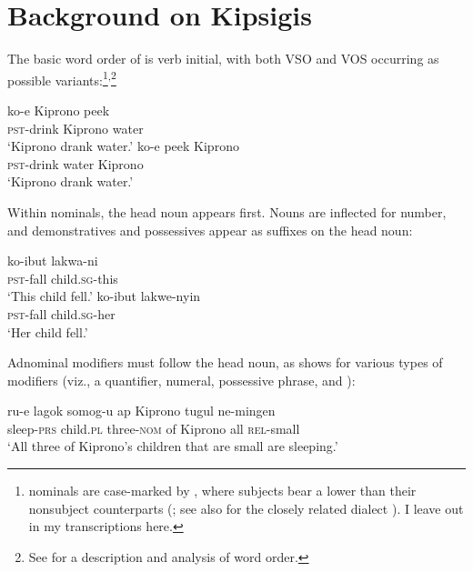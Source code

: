\documentclass[output=paper,newtxmath,modfonts,nonflat,hidelinks]{langsci/langscibook}
\begin{document}
\section{Background on Kipsigis}\label{sec:landman:background} 

The basic word order of  is verb initial, with both VSO and VOS occurring as possible variants:\footnote{ nominals are case-marked by , where subjects bear a lower  than their nonsubject counterparts (\citealt{Jake:1979}; see also \citealt{Creider:1989,Creider:2003} for the closely related dialect ). I leave out  in my transcriptions here.}\textsuperscript{,}\footnote{See \citealt{Diercks:2016b} for a description and analysis of  word order.} 

\ea
  \settowidth{}  
  \ea \gll	ko-e Kiprono peek\\
			\textsc{pst}-drink Kiprono water\\ 
      \glt ‘Kiprono drank water.’\label{ex:landman:VSO}
  \ex \gll ko-e peek Kiprono\\
           \textsc{pst}-drink water Kiprono\\ 
      \glt ‘Kiprono drank water.’\label{ex:landman:VOS}
  \z
\z
 
Within nominals, the head noun appears first. Nouns are inflected for number, and demonstratives  and possessives  appear as suffixes on the head noun:

\ea
  \settowidth{}  
  \ea \label{ex:landman:6a}
    \gll ko-ibut lakwa-ni \\
      \textsc{pst}-fall child.\textsc{sg}-this\\                 
      \glt ‘This child fell.’
  \ex\label{ex:landman:6b}
    \gll ko-ibut lakwe-nyin \\
      \textsc{pst}-fall child.\textsc{sg}-her\\                   
      \glt ‘Her child fell.’
  \z
\z 

\noindent Adnominal modifiers must follow the head noun, as  shows for various types of modifiers (viz., a quantifier, numeral, possessive phrase, and ): 

\ea \label{ex:landman:7a}
  \gll ru-e lagok somog-u ap Kiprono tugul ne-mingen\\
       sleep-\textsc{prs} child.\textsc{pl} three-\textsc{nom} of Kiprono all \textsc{rel}-small\\
  \glt ‘All three of Kiprono's children that are small are sleeping.’
\z
\end{document}
